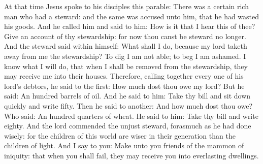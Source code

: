 \begin{multicols}{2}

At that time Jesus spoke to his disciples this parable:
There was a certain rich man
who had a steward: and the same was accused unto him, that he had wasted
his goods.
And he called him and said to him: How is it that I hear this of
thee? Give an account of thy stewardship: for now thou canst be steward
no longer.
And the steward said within himself: What shall I do, because my
lord taketh away from me the stewardship? To dig I am not able; to beg I
am ashamed.
I know what I will do, that when I shall be removed from the
stewardship, they may receive me into their houses.
Therefore, calling together every one of his lord's debtors, he
said to the first: How much dost thou owe my lord?
But he said: An hundred barrels of oil. And he said to him: Take
thy bill and sit down quickly and write fifty.
Then he said to another: And how much dost thou owe? Who said: An
hundred quarters of wheat. He said to him: Take thy bill and write
eighty.
And the lord commended the unjust steward, forasmuch as he had
done wisely: for the children of this world are wiser in their
generation than the children of light.
And I say to you: Make unto you friends of the mammon of iniquity:
that when you shall fail, they may receive you into everlasting
dwellings.



\bigskip




\end{multicols}
